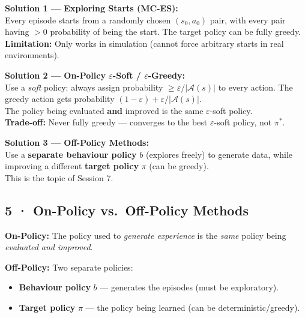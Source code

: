 \documentclass[11pt,a4paper]{article}
\begin{document}
\begin{tcolorbox}[exam={Three Solutions to the Exploration Problem}]

\textbf{Solution 1 — Exploring Starts (MC-ES):}\\
Every episode starts from a randomly chosen $(s_0, a_0)$ pair, with every pair having
$> 0$ probability of being the start. The target policy can be fully greedy.\\
\textbf{Limitation:} Only works in simulation (cannot force arbitrary starts in real environments).

\medskip
\textbf{Solution 2 — On-Policy $\varepsilon$-Soft / $\varepsilon$-Greedy:}\\
Use a \emph{soft} policy: always assign probability $\geq \varepsilon/|\mathcal{A}(s)|$ to every action.
The greedy action gets probability $(1-\varepsilon) + \varepsilon/|\mathcal{A}(s)|$.\\
The policy being evaluated \textbf{and} improved is the same $\varepsilon$-soft policy.\\
\textbf{Trade-off:} Never fully greedy — converges to the best $\varepsilon$-soft policy, not $\pi^*$.

\medskip
\textbf{Solution 3 — Off-Policy Methods:}\\
Use a \textbf{separate behaviour policy} $b$ (explores freely) to generate data,
while improving a different \textbf{target policy} $\pi$ (can be greedy). \\
This is the topic of Session 7.
\end{tcolorbox}

\subsection*{5 · On-Policy vs.\ Off-Policy Methods}

\begin{tcolorbox}[defn={Key Distinction}]
\textbf{On-Policy:} The policy used to \emph{generate experience} is the \emph{same} policy
being \emph{evaluated and improved}.

\medskip
\textbf{Off-Policy:} Two separate policies:
\begin{itemize}
  \item \textbf{Behaviour policy} $b$ — generates the episodes (must be exploratory).
  \item \textbf{Target policy} $\pi$ — the policy being learned (can be deterministic/greedy).
\end{itemize}
\end{tcolorbox}
\end{document}
